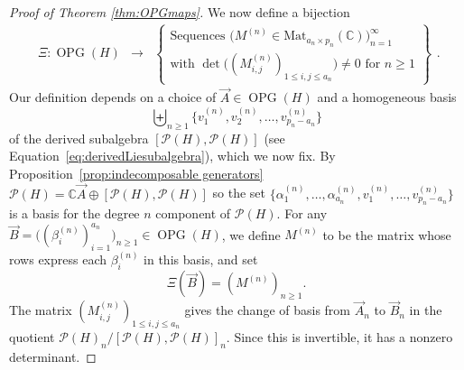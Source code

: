 \documentclass[11pt]{amsart}
\theoremstyle{definition}
\numberwithin{equation}{section}
\def\CC{{\mathbb C}}
\newcommand{\OPG}{\operatorname{OPG}}
\begin{document}
\begin{proof}[Proof of Theorem \ref{thm:OPGmaps}]
We now define a bijection
\[
\begin{array}{rcl}
\Xi: \OPG(H) &\to& \left\{ \begin{array}{c}
\text{Sequences $\big(M^{(n)} \in \mathrm{Mat}_{a_{n} \times p_{n}}(\CC)\big)_{n=1}^{\infty}$ } \\
\text{with $\det\big( (M^{(n)}_{i, j})_{1 \le i, j \le a_{n}} \big) \neq 0$ for $n \ge 1$}
\end{array}\right\}
\end{array}.
\]
Our definition depends on a choice of $\vec{A} \in \OPG(H)$ and a homogeneous basis 
\[
\biguplus_{n \geq 1}\{v_1^{(n)},v_2^{(n)},\ldots,v_{p_n - a_n}^{(n)}\}
\]
of the derived subalgebra $[\mathcal{P}(H),\mathcal{P}(H)]$  (see Equation~\eqref{eq:derivedLiesubalgebra}), which we now fix.  
By Proposition~\ref{prop:indecomposable generators} $\mathcal{P}(H) = \CC \vec{A} \oplus [\mathcal{P}(H), \mathcal{P}(H)]$ so the set $\{\alpha_{1}^{(n)}, \ldots, \alpha_{a_{n}}^{(n)}, v_{1}^{(n)}, \ldots, v_{p_n - a_n}^{(n)}\}$ is a basis for the degree $n$ component of $\mathcal{P}(H)$.  
For any $\vec{B} = \big((\beta_{i}^{(n)})_{i=1}^{a_{n}}\big)_{n \ge 1} \in \OPG(H)$, we define $M^{(n)}$ to be the matrix whose rows express each $\beta_{i}^{(n)}$ in this basis, and set
\[
\Xi(\vec{B}) = (M^{(n)})_{n \ge 1}.
\]
The matrix $(M^{(n)}_{i, j})_{1 \le i, j \le a_{n}}$ gives the change of basis from $\vec{A}_{n}$ to $\vec{B}_{n}$ in the quotient $\mathcal{P}(H)_{n}/[\mathcal{P}(H),\mathcal{P}(H)]_{n}$.  Since this is invertible, it has a nonzero determinant.


\end{proof}
\end{document}
